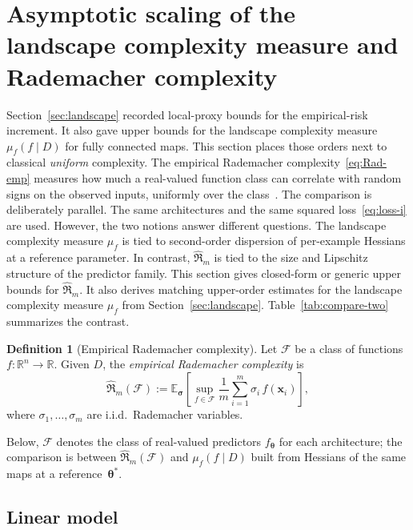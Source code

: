 \documentclass[10pt,letterpaper]{article}
\theoremstyle{definition}
\newtheorem{definition}{Definition}
\begin{document}
\section{Asymptotic scaling of the landscape complexity measure and Rademacher complexity}\label{sec:compare}

Section~\ref{sec:landscape} recorded local-proxy bounds for the empirical-risk increment. It also gave upper bounds for the landscape complexity measure $\mu_f(f\mid D)$ for fully connected maps.
This section places those orders next to classical \emph{uniform} complexity. The empirical Rademacher complexity~\eqref{eq:Rad-emp} measures how much a real-valued function class can correlate with random signs on the observed inputs, uniformly over the class~\cite{bartlett2002}.
The comparison is deliberately parallel. The same architectures and the same squared loss~\eqref{eq:loss-i} are used. However, the two notions answer different questions. The landscape complexity measure $\mu_f$ is tied to second-order dispersion of per-example Hessians at a reference parameter. In contrast, $\hat{\mathfrak{R}}_m$ is tied to the size and Lipschitz structure of the predictor family.
This section gives closed-form or generic upper bounds for $\hat{\mathfrak{R}}_m$. It also derives matching upper-order estimates for the landscape complexity measure $\mu_f$ from Section~\ref{sec:landscape}. Table~\ref{tab:compare-two} summarizes the contrast.

\begin{definition}[Empirical Rademacher complexity]\label{def:rademacher}
Let $\mathcal{F}$ be a class of functions $f:\mathbb{R}^n\to\mathbb{R}$.
Given $D$, the \emph{empirical Rademacher complexity} is
\begin{equation}\label{eq:Rad-emp}
  \hat{\mathfrak{R}}_m(\mathcal{F})
  := \mathbb{E}_{\boldsymbol{\sigma}}
  \left[
    \sup_{f\in\mathcal{F}}
    \frac{1}{m}\sum_{i=1}^{m}\sigma_i\, f(\mathbf{x}_i)
  \right],
\end{equation}
where $\sigma_1,\ldots,\sigma_m$ are i.i.d.\ Rademacher variables.
\end{definition}
\noindent
Below, $\mathcal{F}$ denotes the class of real-valued predictors $f_{\boldsymbol{\theta}}$ for each architecture; the comparison is between $\hat{\mathfrak{R}}_m(\mathcal{F})$ and $\mu_f(f\mid D)$ built from Hessians of the same maps at a reference~$\boldsymbol{\theta}^*$.

\subsection{Linear model}\label{subsec:linear-comp}
\end{document}
